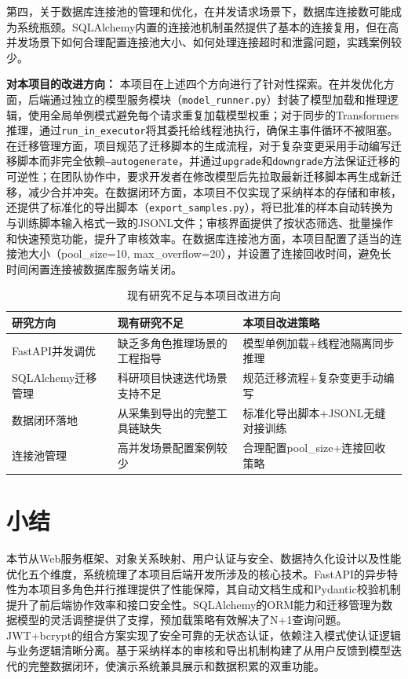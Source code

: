 \documentclass[12pt,a4paper]{ctexart}
\begin{document}
第四，关于数据库连接池的管理和优化，在并发请求场景下，数据库连接数可能成为系统瓶颈。SQLAlchemy内置的连接池机制虽然提供了基本的连接复用，但在高并发场景下如何合理配置连接池大小、如何处理连接超时和泄露问题，实践案例较少。

\textbf{对本项目的改进方向：} 本项目在上述四个方向进行了针对性探索。在并发优化方面，后端通过独立的模型服务模块（\texttt{model\_runner.py}）封装了模型加载和推理逻辑，使用全局单例模式避免每个请求重复加载模型权重；对于同步的Transformers推理，通过\texttt{run\_in\_executor}将其委托给线程池执行，确保主事件循环不被阻塞。在迁移管理方面，项目规范了迁移脚本的生成流程，对于复杂变更采用手动编写迁移脚本而非完全依赖\texttt{--autogenerate}，并通过\texttt{upgrade}和\texttt{downgrade}方法保证迁移的可逆性；在团队协作中，要求开发者在修改模型后先拉取最新迁移脚本再生成新迁移，减少合并冲突。在数据闭环方面，本项目不仅实现了采纳样本的存储和审核，还提供了标准化的导出脚本（\texttt{export\_samples.py}），将已批准的样本自动转换为与训练脚本输入格式一致的JSONL文件；审核界面提供了按状态筛选、批量操作和快速预览功能，提升了审核效率。在数据库连接池方面，本项目配置了适当的连接池大小（pool\_size=10, max\_overflow=20），并设置了连接回收时间，避免长时间闲置连接被数据库服务端关闭。

\begin{table}[H]
\centering
\caption{现有研究不足与本项目改进方向}
\label{tab:research_gap}
\begin{tabular}{p{3.5cm}|p{3.5cm}|p{3.5cm}}
\toprule
研究方向 & 现有研究不足 & 本项目改进策略 \\
\midrule
FastAPI并发调优 & 缺乏多角色推理场景的工程指导 & 模型单例加载+线程池隔离同步推理 \\
SQLAlchemy迁移管理 & 科研项目快速迭代场景支持不足 & 规范迁移流程+复杂变更手动编写 \\
数据闭环落地 & 从采集到导出的完整工具链缺失 & 标准化导出脚本+JSONL无缝对接训练 \\
连接池管理 & 高并发场景配置案例较少 & 合理配置pool\_size+连接回收策略 \\
\bottomrule
\end{tabular}
\end{table}

\section{小结}

本节从Web服务框架、对象关系映射、用户认证与安全、数据持久化设计以及性能优化五个维度，系统梳理了本项目后端开发所涉及的核心技术。FastAPI的异步特性为本项目多角色并行推理提供了性能保障，其自动文档生成和Pydantic校验机制提升了前后端协作效率和接口安全性。SQLAlchemy的ORM能力和迁移管理为数据模型的灵活调整提供了支撑，预加载策略有效解决了N+1查询问题。JWT+bcrypt的组合方案实现了安全可靠的无状态认证，依赖注入模式使认证逻辑与业务逻辑清晰分离。基于采纳样本的审核和导出机制构建了从用户反馈到模型迭代的完整数据闭环，使演示系统兼具展示和数据积累的双重功能。
\end{document}
